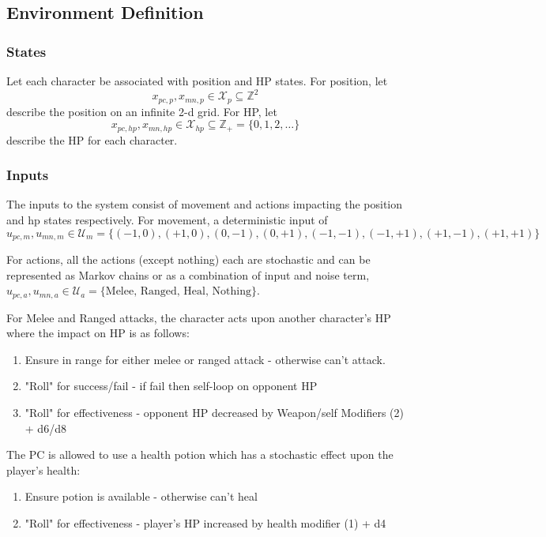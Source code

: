 \documentclass[9pt, onecolumn]{report}
\newcommand{\Z}{\mathbb{Z}}
\begin{document}
\subsection{Environment Definition}
\subsubsection{States}
Let each character be associated with position and HP states.
For position, let \[
    x_{pc,p}, x_{mn,p} \in \mathcal{X}_{p} \subseteq \Z^{2}
\] describe the position on an infinite 2-d grid.
For HP, let \[
    x_{pc,hp}, x_{mn,hp} \in \mathcal{X}_{hp} \subseteq \Z_+ = \{0, 1, 2, \dots\}
\] describe the HP for each character.

\subsubsection{Inputs}
The inputs to the system consist of movement and actions impacting the position and hp states respectively.
For movement, a deterministic input of \[
    u_{pc,m}, u_{mn,m} \in \mathcal{U}_{m} = \{(-1,0), (+1,0), (0,-1),(0,+1), (-1,-1), (-1,+1), (+1,-1),(+1,+1)\}
\]

For actions, all the actions (except nothing) each are stochastic and can be represented as Markov chains or as a combination of input and noise term, $u_{pc,a}, u_{mn,a} \in \mathcal{U}_{a} = \{\text{Melee, Ranged, Heal, Nothing}\}$.

For Melee and Ranged attacks, the character acts upon another character's HP where the impact on HP is as follows:
\begin{enumerate}
    \item Ensure in range for either melee or ranged attack - otherwise can't attack.
    \item "Roll" for success/fail - if fail then self-loop on opponent HP
    \item "Roll" for effectiveness - opponent HP decreased by Weapon/self Modifiers (2) + d6/d8
\end{enumerate}

The PC is allowed to use a health potion which has a stochastic effect upon the player's health:
\begin{enumerate}
    \item Ensure potion is available - otherwise can't heal
    \item "Roll" for effectiveness - player's HP increased by health modifier (1) + d4
\end{enumerate}
\end{document}
